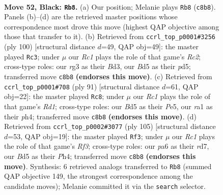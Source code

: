\documentclass[11pt]{article}
\begin{document}
\clearpage

\begin{figure}[p]\centering
\begin{subfigure}{0.46\textwidth}\centering
\resizebox{\linewidth}{!}{%
\newchessgame
\chessboard[
  setfen={2rk2r1/p1p5/P1p3p1/2Pb1p1p/1P3P1P/6R1/5K2/RN6 b - - 27 52},
  showmover=false,
  pgfstyle=straightmove, color=movearrow, markmove={c8-b8}
]}
\caption{}
\end{subfigure}\hfill
\begin{subfigure}{0.46\textwidth}\centering
\resizebox{\linewidth}{!}{%
\newchessgame
\chessboard[
  setfen={3k1r2/8/1p1nr1p1/p2p2Pp/P4P1P/1P1B4/1KR5/5R2 w - - 6 51},
  showmover=false,
  pgfstyle=straightmove, color=movearrow, markmove={c2-c3}
]}
\caption{}
\end{subfigure}
\\[4pt]
\begin{subfigure}{0.46\textwidth}\centering
\resizebox{\linewidth}{!}{%
\newchessgame
\chessboard[
  setfen={3r2k1/1p3rp1/p2p4/P2Pp2p/4P2P/1R4P1/1P4K1/3R4 b - - 0 46},
  showmover=false,
  pgfstyle=straightmove, color=movearrow, markmove={d8-c8}
]}
\caption{}
\end{subfigure}\hfill
\begin{subfigure}{0.46\textwidth}\centering
\resizebox{\linewidth}{!}{%
\newchessgame
\chessboard[
  setfen={6r1/1R1R4/p4rk1/1p2p1p1/1Pp1P1Pp/2P4P/3K4/8 b - - 6 53},
  showmover=false,
  pgfstyle=straightmove, color=movearrow, markmove={f6-f3}
]}
\caption{}
\end{subfigure}
\caption{\textbf{Move 52, Black: \texttt{Rb8}.} (a) Our position; Melanie plays \texttt{Rb8} (\texttt{c8b8}). Panels (b)--(d) are the retrieved master positions whose correspondence most drove this move (highest QAP objective among those that transfer to it). (b) Retrieved from \texttt{ccrl\_top\_p0001\#3256} (ply 100) [structural distance $d$=49, QAP obj=49]: the master played \texttt{Rc3}; under $\mu$ our \emph{Rc1} plays the role of that game's \emph{Rc2}; cross-type roles: our \emph{r}g3 as their \emph{B}d3, our \emph{B}d5 as their \emph{p}d5; transferred move \texttt{c8b8} \textbf{(endorses this move)}. (c) Retrieved from \texttt{ccrl\_top\_p0001\#708} (ply 91) [structural distance $d$=61, QAP obj=22]: the master played \texttt{Rc8}; under $\mu$ our \emph{Rc1} plays the role of that game's \emph{Rd1}; cross-type roles: our \emph{B}d5 as their \emph{P}e5, our \emph{r}a1 as their \emph{p}h4; transferred move \texttt{c8b8} \textbf{(endorses this move)}. (d) Retrieved from \texttt{ccrl\_top\_p0002\#3077} (ply 105) [structural distance $d$=53, QAP obj=19]: the master played \texttt{Rf3}; under $\mu$ our \emph{Rc1} plays the role of that game's \emph{Rf3}; cross-type roles: our \emph{p}a6 as their \emph{r}d7, our \emph{B}d5 as their \emph{P}h4; transferred move \texttt{c8b8} \textbf{(endorses this move)}. Synthesis: 6 retrieved analogs transferred to \texttt{Rb8} (summed QAP objective 149, the strongest correspondence among the candidate moves); Melanie committed it via the \texttt{search} selector.}
\label{fig:thought-m103}
\end{figure}
\end{document}
